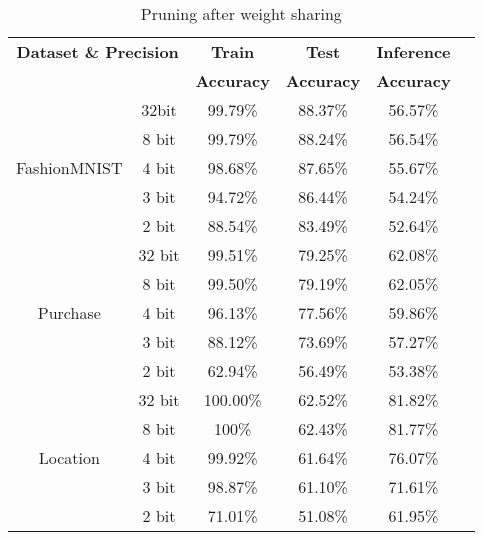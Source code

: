 \begin{table}[!htb]
\begin{center}
\renewcommand\arraystretch{1.5}
\fontsize{6.7pt}{6.7pt}\selectfont
\begin{tabular}{|c|c|c|c|c|c|}
\hline
\multicolumn{2}{|c|}{\textbf{Dataset \& Precision}} & \textbf{Train}  & \textbf{Test}  & \textbf{Inference}  \\
 \multicolumn{2}{|c|}{} & \textbf{Accuracy} & \textbf{Accuracy} & \textbf{Accuracy}  \\
\hline
\multirow{5}{*}{FashionMNIST} & 32bit & 99.79\% & 88.37\% & 56.57\% \\
& 8 bit & 99.79\% & 88.24\% & 56.54\% \\
& 4 bit & 98.68\% & 87.65\% & 55.67\% \\
& 3 bit & 94.72\% & 86.44\% & 54.24\% \\
& 2 bit & 88.54\% & 83.49\% & 52.64\% \\
\hline
\multirow{5}{*}{Purchase} & 32 bit & 99.51\% & 79.25\% & 62.08\% \\
& 8 bit & 99.50\% & 79.19\% & 62.05\% \\
& 4 bit & 96.13\% & 77.56\% & 59.86\% \\
& 3 bit & 88.12\% & 73.69\% & 57.27\% \\
& 2 bit & 62.94\% & 56.49\% & 53.38\% \\
\hline
\multirow{5}{*}{Location} & 32 bit & 100.00\% & 62.52\% & 81.82\% \\
& 8 bit & 100\% & 62.43\% & 81.77\% \\
& 4 bit & 99.92\% & 61.64\% & 76.07\% \\
& 3 bit & 98.87\% & 61.10\% & 71.61\% \\
& 2 bit & 71.01\% & 51.08\% & 61.95\% \\
\hline
\end{tabular}
\end{center}
\caption{Pruning after weight sharing}
\label{fmnist_quantize}
\end{table}
